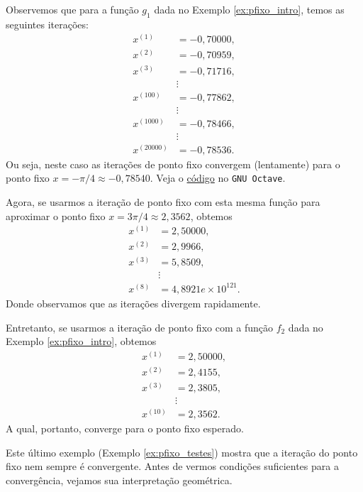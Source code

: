 \begin{ex}\label{ex:pfixo_testes}
  Observemos que para a função $g_1$ dada no Exemplo \ref{ex:pfixo_intro}, temos as seguintes iterações:
  \begin{align}
    x^{(1)} &= -0,70000,\\
    x^{(2)} &= -0,70959,\\
    x^{(3)} &= -0,71716,\\
    &\vdots \\
    x^{(100)} &= -0,77862,\\
    &\vdots \\
    x^{(1000)} &= -0,78466,\\    
    &\vdots \\
    x^{(20000)} &= -0,78536.
  \end{align}
Ou seja, neste caso as iterações de ponto fixo convergem (lentamente) para o ponto fixo $x=-\pi/4\approx -0,78540$.
\ifisoctave
Veja o \href{https://github.com/phkonzen/notas/blob/master/src/MatematicaNumerica/cap_eq1d/dados/ex_pfixo_testes/ex_g1_t1.m}{código} no \verb+GNU Octave+.
\fi

Agora, se usarmos a iteração de ponto fixo com esta mesma função para aproximar o ponto fixo $x=3\pi/4\approx 2,3562$, obtemos
  \begin{align}
    x^{(1)} &= 2,50000,\\
    x^{(2)} &= 2,9966,\\
    x^{(3)} &= 5,8509,\\
    &\vdots \\
    x^{(8)} &= 4,8921e\times 10^{121}.
  \end{align}
Donde observamos que as iterações divergem rapidamente.

Entretanto, se usarmos a iteração de ponto fixo com a função $f_2$ dada no Exemplo \ref{ex:pfixo_intro}, obtemos
  \begin{align}
    x^{(1)} &= 2,50000,\\
    x^{(2)} &= 2,4155,\\
    x^{(3)} &= 2,3805,\\
    &\vdots \\
    x^{(10)} &= 2,3562.
  \end{align}
A qual, portanto, converge para o ponto fixo esperado.
\end{ex}

Este último exemplo (Exemplo \ref{ex:pfixo_testes}) mostra que a iteração do ponto fixo nem sempre é convergente. Antes de vermos condições suficientes para a convergência, vejamos sua interpretação geométrica.

